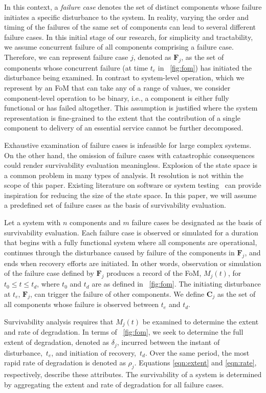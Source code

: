 \documentclass[review]{elsarticle}
\begin{document}
In this context, a \emph{failure case} denotes the set of distinct components whose failure initiates a specific disturbance to the system. In reality, varying the order and timing of the failures of the same set of components can lead to several different failure cases. In this initial stage of our research, for simplicity and tractability, we assume concurrent failure of all components comprising a failure case. Therefore, we can represent failure case $j$, denoted as $\mathbf{F}_j$, as the set of components whose concurrent failure (at time $t_e$ in \figurename~\ref{fig:fom}) has initiated the disturbance being examined. In contrast to system-level operation, which we represent by an FoM that can take any of a range of values, we consider component-level operation to be binary, i.e., a component is either fully functional or has failed altogether. This assumption is justified where the system representation is fine-grained to the extent that the contribution of a single component to delivery of an essential service cannot be further decomposed.

Exhaustive examination of failure cases is infeasible for large complex systems. On the other hand, the omission of failure cases with catastrophic consequences could render survivability evaluation meaningless. Explosion of the state space is a common problem in many types of analysis. It resolution is not within the scope of this paper. Existing literature on software or system testing~\cite{CoR79} can provide inspiration for reducing the size of the state space. In this paper, we will assume a predefined set of failure cases as the basis of survivability evaluation.

Let a system with $n$ components and $m$ failure cases be designated as the basis of survivability evaluation. Each failure case is observed or simulated for a duration that begins with a fully functional system where all components are operational, continues through the disturbance caused by failure of the components in $\mathbf{F}_j$, and ends when recovery efforts are initiated. In other words, observation or simulation of the failure case defined by $\mathbf{F}_j$ produces a record of the FoM, $M_j(t)$, for $t_0 \leq t \leq t_d$, where $t_0$ and $t_d$ are as defined in \figurename~\ref{fig:fom}. The initiating disturbance at $t_e$, $\mathbf{F}_j$, can trigger the failure of other components. We define $\mathbf{C}_j$ as the set of all components whose failure is observed between $t_e$ and $t_d$.

Survivability analysis requires that $M_j(t)$ be examined to determine the extent and rate of degradation. In terms of \figurename~\ref{fig:fom}, we seek to determine the full extent of degradation, denoted as $\delta_j$, incurred between the instant of disturbance,~$t_e$, and initiation of recovery,~$t_d$. Over the same period, the most rapid rate of degradation is denoted as $\rho_j$. Equations \eqref{eqn:extent} and \eqref{eqn:rate}, respectively, describe these attributes. The survivability of a system is determined by aggregating the extent and rate of degradation for all failure cases.
\end{document}
